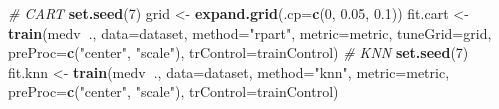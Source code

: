 \documentclass[]{book}
\newenvironment{Shaded}{\begin{snugshade}}{\end{snugshade}}
\newcommand{\CommentTok}[1]{\textcolor[rgb]{0.56,0.35,0.01}{\textit{#1}}}
\newcommand{\DataTypeTok}[1]{\textcolor[rgb]{0.13,0.29,0.53}{#1}}
\newcommand{\DecValTok}[1]{\textcolor[rgb]{0.00,0.00,0.81}{#1}}
\newcommand{\FloatTok}[1]{\textcolor[rgb]{0.00,0.00,0.81}{#1}}
\newcommand{\KeywordTok}[1]{\textcolor[rgb]{0.13,0.29,0.53}{\textbf{#1}}}
\newcommand{\NormalTok}[1]{#1}
\newcommand{\OperatorTok}[1]{\textcolor[rgb]{0.81,0.36,0.00}{\textbf{#1}}}
\newcommand{\StringTok}[1]{\textcolor[rgb]{0.31,0.60,0.02}{#1}}
\begin{document}
\begin{Shaded}
\begin{Highlighting}[]
\CommentTok{# CART}
\KeywordTok{set.seed}\NormalTok{(}\DecValTok{7}\NormalTok{)}
\NormalTok{grid <-}\StringTok{ }\KeywordTok{expand.grid}\NormalTok{(}\DataTypeTok{.cp=}\KeywordTok{c}\NormalTok{(}\DecValTok{0}\NormalTok{, }\FloatTok{0.05}\NormalTok{, }\FloatTok{0.1}\NormalTok{))}
\NormalTok{fit.cart <-}\StringTok{ }\KeywordTok{train}\NormalTok{(medv}\OperatorTok{~}\NormalTok{., }\DataTypeTok{data=}\NormalTok{dataset, }\DataTypeTok{method=}\StringTok{"rpart"}\NormalTok{, }
                  \DataTypeTok{metric=}\NormalTok{metric, }\DataTypeTok{tuneGrid=}\NormalTok{grid, }
                  \DataTypeTok{preProc=}\KeywordTok{c}\NormalTok{(}\StringTok{"center"}\NormalTok{, }\StringTok{"scale"}\NormalTok{), }
                  \DataTypeTok{trControl=}\NormalTok{trainControl)}
\CommentTok{# KNN}
\KeywordTok{set.seed}\NormalTok{(}\DecValTok{7}\NormalTok{)}
\NormalTok{fit.knn <-}\StringTok{ }\KeywordTok{train}\NormalTok{(medv}\OperatorTok{~}\NormalTok{., }\DataTypeTok{data=}\NormalTok{dataset, }\DataTypeTok{method=}\StringTok{"knn"}\NormalTok{, }
                 \DataTypeTok{metric=}\NormalTok{metric, }\DataTypeTok{preProc=}\KeywordTok{c}\NormalTok{(}\StringTok{"center"}\NormalTok{, }\StringTok{"scale"}\NormalTok{), }
                 \DataTypeTok{trControl=}\NormalTok{trainControl)}


\end{Highlighting}
\end{Shaded}
\end{document}

